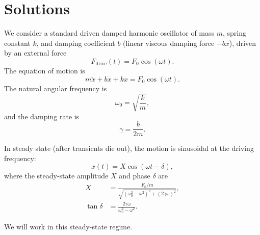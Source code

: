 \documentclass[../main.tex]{subfiles}
\begin{document}
\maketitle

\section*{Solutions}

We consider a standard driven damped harmonic oscillator of mass $m$, spring constant $k$, and damping coefficient $b$ (linear viscous damping force $-b\dot{x}$), driven by an external force
\[
F_\text{drive}(t) = F_0 \cos(\omega t).
\]
The equation of motion is
\begin{equation}
m \ddot{x} + b \dot{x} + k x = F_0 \cos(\omega t).
\label{eq:eom}
\end{equation}
The natural angular frequency is
\[
\omega_0 = \sqrt{\frac{k}{m}},
\]
and the damping rate is
\[
\gamma = \frac{b}{2m}.
\]

In steady state (after transients die out), the motion is sinusoidal at the driving frequency:
\begin{equation}
x(t) = X \cos(\omega t - \delta),
\label{eq:x_of_t}
\end{equation}
where the steady-state amplitude $X$ and phase $\delta$ are
\begin{align}
X &= \frac{F_0/m}{\sqrt{(\omega_0^2 - \omega^2)^2 + (2\gamma \omega)^2}}, \\
\tan \delta &= \frac{2\gamma \omega}{\omega_0^2 - \omega^2}.
\end{align}

We will work in this steady-state regime.
\end{document}
